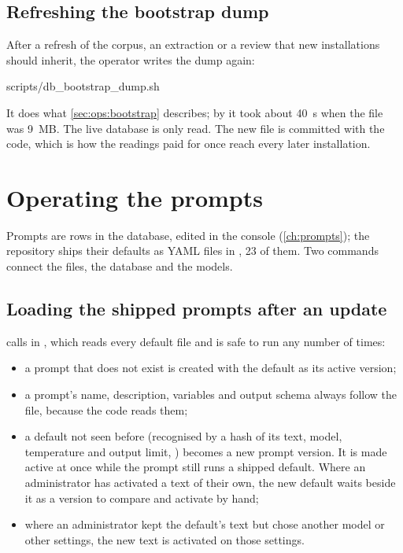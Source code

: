 \subsection{Refreshing the bootstrap dump}

After a refresh of the corpus, an extraction or a review that new installations should
inherit, the operator writes the dump again:

\begin{codeblock}
scripts/db_bootstrap_dump.sh
\end{codeblock}

It does what \cref{sec:ops:bootstrap} describes; by
 it took about 40~s when the file was 9~MB. The live database is only read. The new file is committed with the
code, which is how the readings paid for once reach every later installation.


\section{Operating the prompts}\label{sec:ops:prompts}

Prompts are rows in the database, edited in the console (\cref{ch:prompts}); the repository
ships their defaults as YAML files in , 23 of them. Two commands
connect the files, the database and the models.

\subsection{Loading the shipped prompts after an update}

 calls  in , which reads every
default file and is safe to run any number of times:

\begin{itemize}
  \item a prompt that does not exist is created with the default as its active version;
  \item a prompt's name, description, variables and output schema always follow the file,
    because the code reads them;
  \item a default not seen before (recognised by a hash of its text, model, temperature and
    output limit, ) becomes a new prompt version. It is made active at once while the prompt still runs a shipped default. Where
    an administrator has activated a text of their own, the new default waits beside it as a
    version to compare and activate by hand;
  \item where an administrator kept the default's text but chose another model or other
    settings, the new text is activated on those settings.
\end{itemize}

